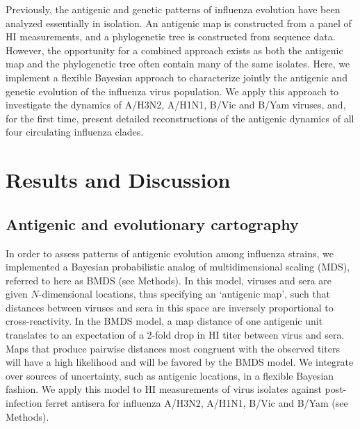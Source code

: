 \documentclass[11pt,oneside,letterpaper]{article}
\begin{document}
Previously, the antigenic and genetic patterns of influenza evolution have been analyzed essentially in isolation. 
An antigenic map is constructed from a panel of HI measurements, and a phylogenetic tree is constructed from sequence data. 
However, the opportunity for a combined approach exists as both the antigenic map and the phylogenetic tree often contain many of the same isolates. 
Here, we implement a flexible Bayesian approach to characterize jointly the antigenic and genetic evolution of the influenza virus population. 
We apply this approach to investigate the dynamics of A/H3N2, A/H1N1, B/Vic and B/Yam viruses, and, for the first time, present detailed reconstructions of the antigenic dynamics of all four circulating influenza clades.

\section*{Results and Discussion}

\subsection*{Antigenic and evolutionary cartography}

In order to assess patterns of antigenic evolution among influenza strains, we implemented a Bayesian probabilistic analog of multidimensional scaling (MDS), referred to here as BMDS (see Methods).
In this model, viruses and sera are given $N$-dimensional locations, thus specifying an `antigenic map', such that distances between viruses and sera in this space are inversely proportional to cross-reactivity.
In the BMDS model, a map distance of one antigenic unit translates to an expectation of a 2-fold drop in HI titer between virus and sera.
Maps that produce pairwise distances most congruent with the observed titers will have a high likelihood and will be favored by the BMDS model.
We integrate over sources of uncertainty, such as antigenic locations, in a flexible Bayesian fashion.
We apply this model to HI measurements of virus isolates against post-infection ferret antisera for influenza A/H3N2, A/H1N1, B/Vic and B/Yam (see Methods).
 
\end{document}
